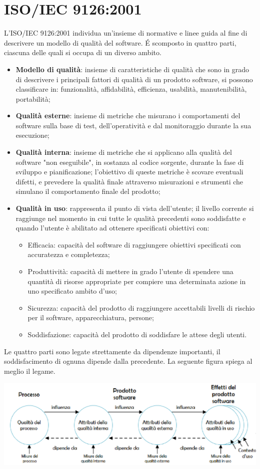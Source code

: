 \section{ISO/IEC 9126:2001}

L'ISO/IEC 9126:2001 individua un'insieme di normative e linee guida al fine di descrivere un modello di qualità del software. \'E scomposto in quattro parti, ciascuna delle quali si occupa di un diverso ambito. 
\begin{itemize}
	\item \textbf{Modello di qualità}: insieme di caratteristiche di qualità che sono in grado di descrivere i principali fattori di qualità di un prodotto software, si possono classificare in: funzionalità, affidabilità, efficienza, usabilità, manutenibilità, portabilità;
	\item \textbf{Qualità esterne}: insieme di metriche che misurano i comportamenti del software sulla base di test, dell'operatività e dal monitoraggio durante la sua esecuzione;
	\item \textbf{Qualità interna}: insieme di metriche che si applicano alla qualità del software "non eseguibile", in sostanza al codice sorgente, durante la fase di sviluppo e pianificazione; l'obiettivo di queste metriche è scovare eventuali difetti, e prevedere la qualità finale attraverso misurazioni e strumenti che simulano il comportamento finale del prodotto;
	\item \textbf{Qualità in uso}: rappresenta il punto di vista dell'utente; il livello corrente si raggiunge nel momento in cui tutte le qualità precedenti sono soddisfatte e quando l'utente è abilitato ad ottenere specificati obiettivi con:
	\begin{itemize}
		\item Efficacia: capacità del software di raggiungere obiettivi specificati con accuratezza e completezza;
		\item Produttività: capacità di mettere in grado l'utente di spendere una quantità di risorse appropriate per compiere una determinata azione in uno specificato ambito d'uso;
		\item Sicurezza: capacità del prodotto di raggiungere accettabili livelli di rischio per il software, apparecchiatura, persone;
		\item Soddisfazione: capacità del prodotto di soddisfare le attese degli utenti.
	\end{itemize}	
\end{itemize}
Le quattro parti sono legate strettamente da dipendenze importanti, il soddisfacimento di ognuna dipende dalla precedente. La seguente figura spiega al meglio il legame.
\begin{center}
\item \includegraphics[scale=0.8]{./images/quality_cicle_iso9126.png} 
\end{center}
 